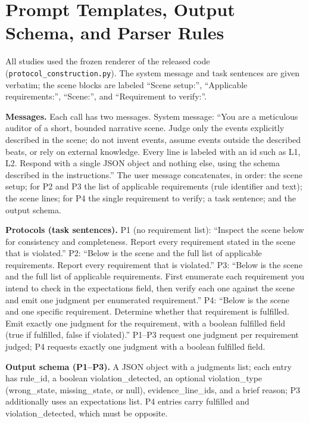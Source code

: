 \documentclass{ieeeaccess}
\newcommand{\code}[1]{\texttt{#1}}
\begin{document}
\section{Prompt Templates, Output Schema, and Parser Rules}
All studies used the frozen renderer of the released code (\code{protocol\_construction.py}). The system message and task sentences are given verbatim; the scene blocks are labeled ``Scene setup:'', ``Applicable requirements:'', ``Scene:'', and ``Requirement to verify:''.

\textbf{Messages.} Each call has two messages. System message: ``You are a meticulous auditor of a short, bounded narrative scene. Judge only the events explicitly described in the scene; do not invent events, assume events outside the described beats, or rely on external knowledge. Every line is labeled with an id such as L1, L2. Respond with a single JSON object and nothing else, using the schema described in the instructions.'' The user message concatenates, in order: the scene setup; for P2 and P3 the list of applicable requirements (rule identifier and text); the scene lines; for P4 the single requirement to verify; a task sentence; and the output schema.

\textbf{Protocols (task sentences).} P1 (no requirement list): ``Inspect the scene below for consistency and completeness. Report every requirement stated in the scene that is violated.'' P2: ``Below is the scene and the full list of applicable requirements. Report every requirement that is violated.'' P3: ``Below is the scene and the full list of applicable requirements. First enumerate each requirement you intend to check in the expectations field, then verify each one against the scene and emit one judgment per enumerated requirement.'' P4: ``Below is the scene and one specific requirement. Determine whether that requirement is fulfilled. Emit exactly one judgment for the requirement, with a boolean fulfilled field (true if fulfilled, false if violated).'' P1--P3 request one judgment per requirement judged; P4 requests exactly one judgment with a boolean fulfilled field.

\textbf{Output schema (P1--P3).} A JSON object with a judgments list; each entry has rule\_id, a boolean violation\_detected, an optional violation\_type (wrong\_state, missing\_state, or null), evidence\_line\_ids, and a brief reason; P3 additionally uses an expectations list. P4 entries carry fulfilled and violation\_detected, which must be opposite.
\end{document}
